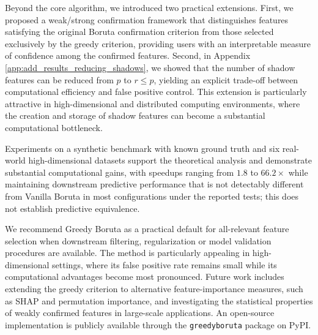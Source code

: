 \documentclass[runningheads]{llncs}
\begin{document}
Beyond the core algorithm, we introduced two practical extensions. First, we proposed a weak/strong confirmation framework that distinguishes features satisfying the original Boruta confirmation criterion from those selected exclusively by the greedy criterion, providing users with an interpretable measure of confidence among the confirmed features. Second, in Appendix \ref{app:add_results_reducing_shadows}, we showed that the number of shadow features can be reduced from $p$ to $r \leq p$, yielding an explicit trade-off between computational efficiency and false positive control. This extension is particularly attractive in high-dimensional and distributed computing environments, where the creation and storage of shadow features can become a substantial computational bottleneck.

Experiments on a synthetic benchmark with known ground truth and six real-world high-dimensional datasets support the theoretical analysis and demonstrate substantial computational gains, with speedups ranging from $1.8$ to $66.2\times$ while maintaining downstream predictive performance that is not detectably different from Vanilla Boruta in most configurations under the reported tests; this does not establish predictive equivalence.

We recommend Greedy Boruta as a practical default for all-relevant feature selection when downstream filtering, regularization or model validation procedures are available. The method is particularly appealing in high-dimensional settings, where its false positive rate remains small while its computational advantages become most pronounced. Future work includes extending the greedy criterion to alternative feature-importance measures, such as SHAP and permutation importance, and investigating the statistical properties of weakly confirmed features in large-scale applications. An open-source implementation is publicly available through the \texttt{greedyboruta} package on PyPI.


\end{document}
